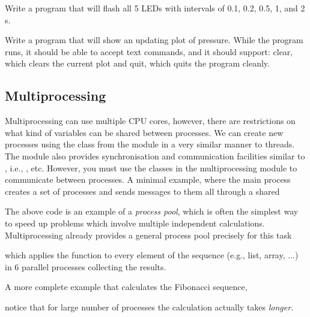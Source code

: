 \begin{exercise}
    Write a program that will flash all 5 LEDs with intervals of 0.1, 0.2, 0.5, 1, and 2 s.
\end{exercise}

\begin{exercise}
    Write a program that will show an updating plot of pressure. While the program runs, it should be able to accept text commands, and it should support: clear, which clears the current plot and quit, which quits the program cleanly.
\end{exercise}

\subsection{Multiprocessing}
Multiprocessing can use multiple CPU cores, however, there are restrictions on what kind of variables can be shared between processes. We can create new processes using the  class from the  module in a very similar manner to threads. The  module also provides synchronisation and communication facilities similar to , i.e., ,  etc. However, you must use the classes in the multiprocessing module to communicate between processes. A minimal example, where the main process creates a set of processes and sends messages to them all through a shared 


The above code is an example of a \emph{process pool}, which is often the simplest way to speed up problems which involve multiple independent calculations. Multiprocessing already provides a general process pool precisely for this task

which applies the function  to every element of the sequence (e.g., list, array, ...) in 6 parallel processes collecting the results.

A more complete example that calculates the Fibonacci sequence,

notice that for large number of processes the calculation actually takes \emph{longer}.

